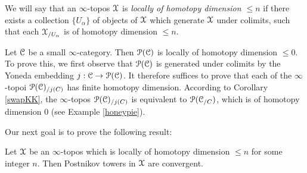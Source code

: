 \begin{definition}
We will say that an $\infty$-topos $\operatorname{\mathcal{X}}$ is {\it locally of homotopy dimension $\leq n$} if there exists a collection $\{U_{\alpha} \}$ of objects of $\operatorname{\mathcal{X}}$ which generate $\operatorname{\mathcal{X}}$ under colimits, such that each $\operatorname{\mathcal{X}}_{/U_{\alpha} }$ is of homotopy dimension $\leq n$.
\end{definition}

\begin{example}
Let $\operatorname{\mathcal{C}}$ be a small $\infty$-category. Then $\operatorname{\mathcal{P}}(\operatorname{\mathcal{C}})$ is locally of homotopy dimension $\leq 0$. To prove this, we first observe that $\operatorname{\mathcal{P}}(\operatorname{\mathcal{C}})$ is generated under colimits by the Yoneda embedding $j: \operatorname{\mathcal{C}} \rightarrow \operatorname{\mathcal{P}}(\operatorname{\mathcal{C}})$. It therefore suffices to prove that
each of the $\infty$-topoi $\operatorname{\mathcal{P}}(\operatorname{\mathcal{C}})_{/j(C)}$ has finite homotopy dimension. According to Corollary \ref{swapKK}, the $\infty$-topos $\operatorname{\mathcal{P}}(\operatorname{\mathcal{C}})_{/j(C)}$ is equivalent to $\operatorname{\mathcal{P}}( \operatorname{\mathcal{C}}_{/C})$, which is of homotopy dimension $0$ (see Example \ref{honeypie}). 
\end{example}

Our next goal is to prove the following result:

\begin{proposition}\label{cumba}
Let $\operatorname{\mathcal{X}}$ be an $\infty$-topos which is locally of homotopy dimension $\leq n$ for some integer $n$. Then Postnikov towers in $\operatorname{\mathcal{X}}$ are convergent.
\end{proposition}




